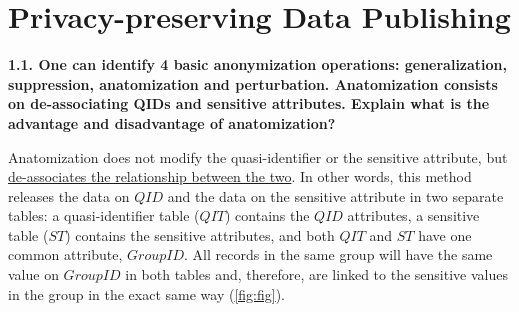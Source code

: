 \documentclass[a4paper, 11pt]{article}
\begin{document}
\section{Privacy-preserving Data Publishing}

\textbf{1.1. One can identify 4 basic anonymization operations: generalization,
suppression, anatomization and perturbation. Anatomization consists on de-associating
QIDs and sensitive attributes. Explain what is the advantage and disadvantage of
anatomization?}

\vspace{\baselineskip}

Anatomization does not modify the quasi-identiﬁer or the sensitive attribute, but
\uline{de-associates the relationship between the two}. In other words, this method
releases the data on $QID$ and the data on the sensitive attribute in two separate
tables: a quasi-identiﬁer table ($QIT$) contains the $QID$ attributes, a sensitive table
($ST$) contains the sensitive attributes, and both $QIT$ and $ST$ have one common attribute,
$GroupID$. All records in the same group will have the same value on $GroupID$ in both
tables and, therefore, are linked to the sensitive values in the group in the exact
same way (\cref{fig:fig}).

\vspace{\baselineskip}
\end{document}
